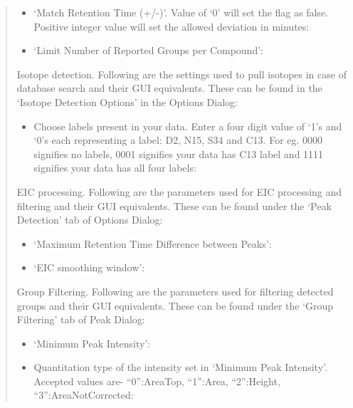 \documentclass[letterpaper,10pt,english,openany,oneside]{sphinxmanual}
\begin{document}
\begin{quote}
\begin{itemize}
\item {} 
‘Match Retention Time (+/-)’. Value of ‘0’ will set the flag as false. Positive integer value will set the allowed deviation in minutes: 

\item {} 
‘Limit Number of Reported Groups per Compound’:  

\end{itemize}

Isotope detection. Following are the settings used to pull isotopes in case of database search and their GUI equivalents. These can be found in the ‘Isotope Detection Options’ in the Options Dialog:
\begin{itemize}
\item {} 
Choose labels present in your data. Enter a four digit value of ‘1’s and ‘0’s each representing a label: D2, N15, S34 and C13. For eg. 0000 signifies no labels, 0001 signifies your data has C13 label and 1111 signifies your data has all four labels: 

\end{itemize}

EIC processing. Following are the parameters used for EIC processing and filtering and their GUI equivalents. These can be found under the ‘Peak Detection’ tab of Options Dialog:
\begin{itemize}
\item {} 
‘Maximum Retention Time Difference between Peaks’:  

\item {} 
‘EIC smoothing window’: 

\end{itemize}

Group Filtering. Following are the parameters used for filtering detected groups and their GUI equivalents. These can be found under the ‘Group Filtering’ tab of Peak Dialog:
\begin{itemize}
\item {} 
‘Minimum Peak Intensity’: 

\item {} 
Quantitation type of the intensity set in ‘Minimum Peak Intensity’. Accepted values are- “0”:AreaTop, “1”:Area, “2”:Height, “3”:AreaNotCorrected: 


\end{itemize}
\end{quote}
\end{document}
